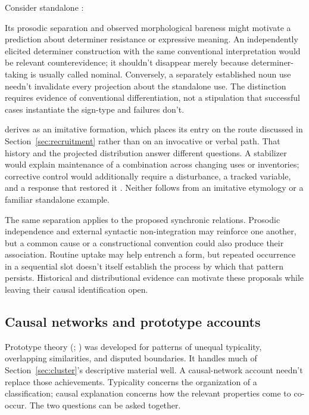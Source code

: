 \documentclass[12pt]{article}
\newcommand{\exmention}[1]{\mention{#1}}
\newcommand{\exfocus}[1]{\uline{#1}}
\begin{document}
Consider standalone :

\ea\label{ex:oof} \exmention{\exfocus{Oof}. That's going to hurt.}
\z

Its prosodic separation and observed morphological bareness might motivate a prediction about determiner resistance or expressive meaning. An independently elicited determiner construction with the same conventional interpretation would be relevant counterevidence; it shouldn't disappear merely because determiner-taking is usually called nominal. Conversely, a separately established noun use needn't invalidate every projection about the standalone use. The distinction requires evidence of conventional differentiation, not a stipulation that successful cases instantiate the sign-type and failures don't.

\textcite{oed_oof} derives  as an imitative formation, which places its entry on the route discussed in Section~\ref{sec:recruitment} rather than on an invocative or verbal path. That history and the projected distribution answer different questions. A stabilizer would explain maintenance of a combination across changing uses or inventories; corrective control would additionally require a disturbance, a tracked variable, and a response that restored it \citep[cf.][]{weinberger2026HomeostasisCausalControl}. Neither follows from an imitative etymology or a familiar standalone example.

The same separation applies to the proposed synchronic relations. Prosodic independence and external syntactic non-integration may reinforce one another, but a common cause or a constructional convention could also produce their association. Routine uptake may help entrench a form, but repeated occurrence in a sequential slot doesn't itself establish the process by which that pattern persists. Historical and distributional evidence can motivate these proposals while leaving their causal identification open.

\subsection{Causal networks and prototype accounts}\label{sec:prototype}

Prototype theory (\citealp{rosch1975}; \citealp[43--53]{taylor2003}) was developed for patterns of unequal typicality, overlapping similarities, and disputed boundaries. It handles much of Section~\ref{sec:cluster}'s descriptive material well. A causal-network account needn't replace those achievements. Typicality concerns the organization of a classification; causal explanation concerns how the relevant properties come to co-occur. The two questions can be asked together.
\end{document}
